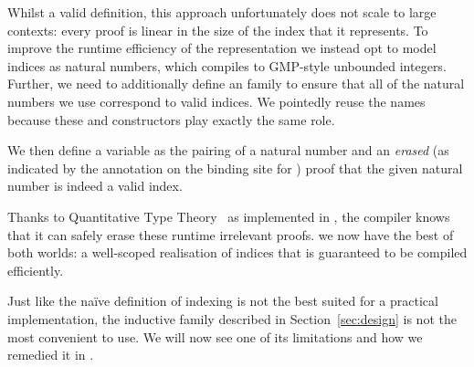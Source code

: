 Whilst a valid definition, this approach unfortunately does not scale to
large contexts:
%
every  proof is linear in the size of the \DeBruijn{}
index that it represents.
%
To improve the runtime efficiency of the representation we instead opt to
model \DeBruijn{} indices as natural numbers, which \Idris{} compiles to
GMP-style unbounded integers.
%
Further, we need to additionally define an  family to ensure that
all of the natural numbers we use correspond to valid indices.
%
We pointedly reuse the  names because these 
and  constructors play exactly the same role.


\noindent
We then define a variable as the pairing of a natural number and an \emph{erased}
(as indicated by the  annotation on the binding site for )
proof that the given natural number is indeed a valid \DeBruijn{} index.


Thanks to Quantitative Type Theory~\cite{DBLP:conf/birthday/McBride16,DBLP:conf/lics/Atkey18}
as implemented in \Idris{}, the compiler knows that it can safely erase these runtime
irrelevant proofs.
%
we now have the best of both worlds: a well-scoped realisation of \DeBruijn{} indices
that is guaranteed to be compiled efficiently.


Just like the naïve definition of \DeBruijn{} indexing is not the
best suited for a practical implementation,
the inductive family  described in Section~\ref{sec:design}
is not the most convenient to use.
%
We will now see one of its limitations and how we remedied it in
\Velo{}.

